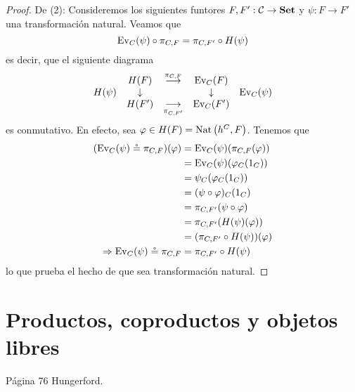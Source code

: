 \documentclass[12pt]{report}
\newcounter{it}
\theoremstyle{largebreak}
\newcommand\cf[3]{\ensuremath{#1:#2\rightarrow#3}}
\newcommand{\Cat}[1]{\ensuremath{\textup{\textbf{#1}}}}
\newcommand{\Ev}{\ensuremath{\textup{Ev}}}
\begin{document}
\begin{proof}
        De (2): Consideremos los siguientes funtores $\cf{F,F'}{\mathcal{C}}{\Cat{Set}}$ y $\cf{\psi}{F}{F'}$ una transformación natural. Veamos que
        \begin{equation*}
            \Ev_C(\psi)\circ\pi_{ C,F}=\pi_{ C,F'}\circ H(\psi)
        \end{equation*}
        es decir, que el siguiente diagrama
        \begin{equation*}
            \begin{array}[pos]{rcccl}
                & H(F) & \overset{\pi_{ C,F}}{\longrightarrow} & \Ev_C(F) & \\
                H(\psi) & \downarrow & & \downarrow & \Ev_C(\psi) \\
               & H(F') & \underset{\pi_{ C,F'}}{\longrightarrow} & \Ev_C(F') & \\
            \end{array}
        \end{equation*}
        es conmutativo. En efecto, sea $\varphi\in H(F)=\textup{Nat}\left(h^C,F\right)$. Tenemos que
        \begin{equation*}
            \begin{split}
                (\Ev_C(\psi)\circeq\pi_{ C,F})(\varphi)&=\Ev_C(\psi)(\pi_{ C,F}(\varphi))\\
                &=\Ev_C(\psi)(\varphi_C(1_C))\\
                &=\psi_C(\varphi_C(1_C))\\
                &=(\psi\circ\varphi)_C(1_C)\\
                &=\pi_{ C,F'}(\psi\circ\varphi)\\
                &=\pi_{C,F'}(H(\psi)(\varphi))\\
                &=(\pi_{C,F'}\circ H(\psi))(\varphi)\\
                \Rightarrow \Ev_C(\psi)\circeq\pi_{ C,F}&=\pi_{C,F'}\circ H(\psi)\\
            \end{split}
        \end{equation*}
        lo que prueba el hecho de que sea transformación natural.
    \end{proof}

    \section{Productos, coproductos y objetos libres}

    Página 76 Hungerford. 
\end{document}
